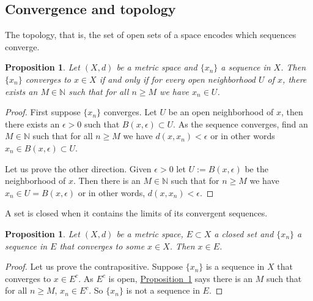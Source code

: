 \documentclass[12pt]{book}
\newcommand{\N}{{\mathbb{N}}}
\theoremstyle{plain}
\newtheorem{prop}[thm]{Proposition}
\theoremstyle{remark}
\theoremstyle{definition}
\theoremstyle{exercise}
\theoremstyle{example}
\newcommand{\propref}[1]{\hyperref[#1]{Proposition~\ref*{#1}}}
\begin{document}
\subsection{Convergence and topology}

The topology, that is, the set of open sets of a space encodes which
sequences converge.

\begin{prop} \label{prop:msconvtopo}
Let $(X,d)$ be a metric space and $\{x_n\}$ a sequence in $X$.  Then
$\{ x_n \}$ converges to $x \in X$ if and only if for every open neighborhood
$U$ of $x$, there exists an $M \in \N$ such that for all $n \geq M$
we have $x_n \in U$.
\end{prop}

\begin{proof}
First suppose $\{ x_n \}$ converges.  Let $U$ be an open neighborhood
of $x$, then there exists an $\epsilon > 0$ such that $B(x,\epsilon) \subset
U$.  As the sequence converges, find an $M \in \N$ such that for all $n \geq
M$ we have $d(x,x_n) < \epsilon$ or in other words $x_n \in B(x,\epsilon)
\subset U$.

Let us prove the other direction.  Given $\epsilon > 0$ let $U :=
B(x,\epsilon)$ be the neighborhood of $x$.  Then there is an $M \in \N$
such that for $n \geq M$ we have $x_n \in U = B(x,\epsilon)$ or in other
words, $d(x,x_n) < \epsilon$.
\end{proof}

A set is closed when it contains the limits of its convergent sequences.

\begin{prop} \label{prop:msclosedlim}
Let $(X,d)$ be a metric space, $E \subset X$ a closed set
and $\{ x_n \}$ a sequence in $E$ that converges to some $x \in X$.
Then $x \in E$.
\end{prop}

\begin{proof}
Let us prove the contrapositive.
Suppose $\{ x_n \}$ is a sequence in $X$ that converges to $x \in E^c$.
As $E^c$ is open, \propref{prop:msconvtopo} says there is
an $M$ such that for all $n \geq M$,
$x_n \in E^c$.  So $\{ x_n \}$  is not a sequence in $E$.
\end{proof}
\end{document}

